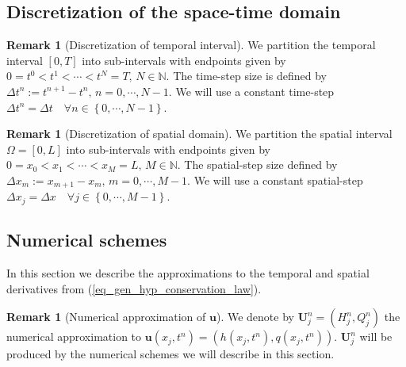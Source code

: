 \documentclass[12pt,a4paper]{article}
\numberwithin{equation}{section}
\theoremstyle{definition}
\newcommand{\W}{\ensuremath{\Omega}\xspace}
\newcommand{\vect}[1]{\textbf{#1}}
\newcommand{\qp}[1]{\left(#1\right)}
\newcommand{\qb}[1]{\left[#1\right]}
\newcommand{\bracegs}[1]{\left\lbrace#1\right\rbrace}
\newtheorem{Rem}[subsection]{Remark}
\begin{document}
\subsection{Discretization of the space-time domain}
\begin{Rem}[Discretization of temporal interval]
	We  partition the temporal interval $\qb{0,T}$ into sub-intervals with endpoints given by $0=t^0<t^1<\cdots<t^N=T,\, N\in \mathbb{N}$.    The time-step size is defined by $\Delta t^n:=t^{n+1}-t^n,\, n=0,\cdots,N-1$.    We will use a constant time-step $\Delta t^n=\Delta t \quad \forall n\in \bracegs{0,\cdots, N-1}$.
\end{Rem}
\begin{Rem}[Discretization of spatial domain]
We partition the spatial interval $\W=\qb{0,L}$ into sub-intervals with endpoints given by $0=x_0<x_1<\cdots<x_M=L,\, M\in \mathbb{N}$.  The spatial-step size  defined by $\Delta x_m:=x_{m+1}-x_m,\, m=0,\cdots,M-1$.   We will use a constant spatial-step  $\Delta x_j =\Delta x \quad \forall j\in \bracegs{0,\cdots,M-1}$.
\end{Rem}
\subsection{Numerical schemes}
In this section we describe the approximations to the temporal and spatial derivatives from (\ref{eq_gen_hyp_conservation_law}).  
\begin{Rem}[Numerical approximation of $\vect{u}$]  We denote by $\vect{U}^n_j=\qp{H^n_j, Q^n_j}$ the numerical approximation to $\vect{u}\qp{x_j,t^n}=\qp{h\qp{x_j,t^n},q\qp{x_j,t^n}}$.  $\vect{U}^n_j$ will be produced by the numerical schemes we will describe in this section.  
\end{Rem}
\end{document}
